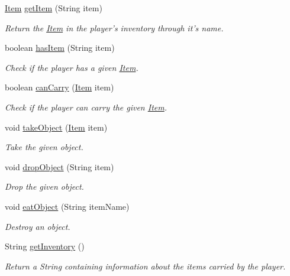 \begin{DoxyCompactItemize}
\hyperlink{classpkg__world_1_1Item}{Item} \hyperlink{classpkg__world_1_1Player_a913aab92cf289f5278e6e995e7a4d118}{get\-Item} (String item)
\begin{DoxyCompactList}\small\item\em Return the \hyperlink{classpkg__world_1_1Item}{Item} in the player's inventory through it's name. \end{DoxyCompactList}\item 
boolean \hyperlink{classpkg__world_1_1Player_a23b53a36fdac45868ee1ea6dcdeca7ce}{has\-Item} (String item)
\begin{DoxyCompactList}\small\item\em Check if the player has a given \hyperlink{classpkg__world_1_1Item}{Item}. \end{DoxyCompactList}\item 
boolean \hyperlink{classpkg__world_1_1Player_acca13cc67931809c8067aaca1b8c8459}{can\-Carry} (\hyperlink{classpkg__world_1_1Item}{Item} item)
\begin{DoxyCompactList}\small\item\em Check if the player can carry the given \hyperlink{classpkg__world_1_1Item}{Item}. \end{DoxyCompactList}\item 
void \hyperlink{classpkg__world_1_1Player_ac5bdaa8f2149e480e57398be03efa96f}{take\-Object} (\hyperlink{classpkg__world_1_1Item}{Item} item)
\begin{DoxyCompactList}\small\item\em Take the given object. \end{DoxyCompactList}\item 
void \hyperlink{classpkg__world_1_1Player_a202b660b747a977911af058554888387}{drop\-Object} (String item)
\begin{DoxyCompactList}\small\item\em Drop the given object. \end{DoxyCompactList}\item 
void \hyperlink{classpkg__world_1_1Player_ab18847eb6503ad2ac400cc7cd5a7c9a0}{eat\-Object} (String item\-Name)
\begin{DoxyCompactList}\small\item\em Destroy an object. \end{DoxyCompactList}\item 
String \hyperlink{classpkg__world_1_1Player_a2a6e491f41e159bbac42022e55df2d52}{get\-Inventory} ()
\begin{DoxyCompactList}\small\item\em Return a String containing information about the items carried by the player. \end{DoxyCompactList}\end{DoxyCompactItemize}

